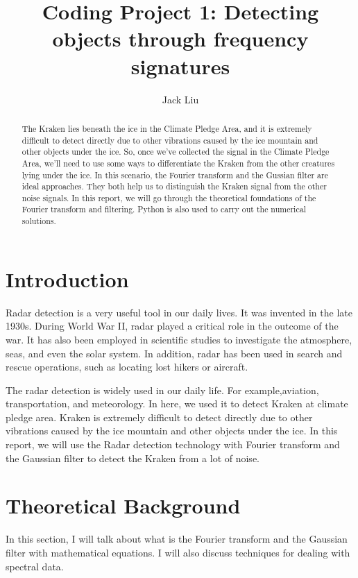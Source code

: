 \documentclass[12pt]{article}%
\begin{document}
\title{Coding Project 1:  Detecting objects through frequency signatures}

\author{Jack Liu}
\date{}

\maketitle


\begin{abstract}
The Kraken lies beneath the ice in the Climate Pledge Area, and it is extremely difficult to detect directly due to other vibrations caused by the ice mountain and other objects under the ice. So, once we've collected the signal in the Climate Pledge Area, we'll need to use some ways to differentiate the Kraken from the other creatures lying under the ice. In this scenario, the Fourier transform and the Gussian filter are ideal approaches. They both help us to distinguish the Kraken signal from the other noise signals. In this report, we will go through the theoretical foundations of the Fourier transform and filtering. Python is also used to carry out the numerical solutions.
\end{abstract}


\section{Introduction}
\label{Sec: Intro}

Radar detection is a very useful tool in our daily lives. It was invented in the late 1930s. During World War II, radar played a critical role in the outcome of the war. It has also been employed in scientific studies to investigate the atmosphere, seas, and even the solar system. In addition, radar has been used in search and rescue operations, such as locating lost hikers or aircraft.

The radar detection is widely used in our daily life. For example,aviation, transportation, and meteorology. In here, we used it to detect Kraken at climate pledge area. Kraken is extremely difficult to detect directly due to other vibrations caused by the ice mountain and other objects under the ice. In this report, we will use the Radar detection technology with Fourier transform and the Gaussian filter to detect the Kraken from a lot of noise.

\section{Theoretical Background}
In this section, I will talk about what is the Fourier transform and the Gaussian filter with mathematical equations. I will also discuss techniques for dealing with spectral data.
\end{document}
